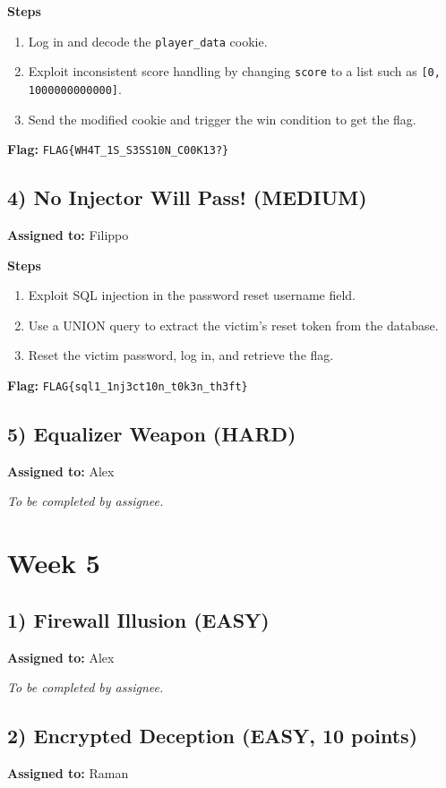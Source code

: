 \documentclass[10pt,a4paper]{article}
\begin{document}
\textbf{Steps}
\begin{enumerate}[leftmargin=*,noitemsep]
  \item Log in and decode the \texttt{player\_data} cookie.
  \item Exploit inconsistent score handling by changing \texttt{score} to a list such as \texttt{[0, 1000000000000]}.
  \item Send the modified cookie and trigger the win condition to get the flag.
\end{enumerate}

\textbf{Flag:} \texttt{FLAG\{WH4T\_1S\_S3SS10N\_C00K13?\}}

\subsection*{4) No Injector Will Pass! (MEDIUM)}
\textbf{Assigned to:} Filippo

\textbf{Steps}
\begin{enumerate}[leftmargin=*,noitemsep]
  \item Exploit SQL injection in the password reset username field.
  \item Use a UNION query to extract the victim's reset token from the database.
  \item Reset the victim password, log in, and retrieve the flag.
\end{enumerate}

\textbf{Flag:} \texttt{FLAG\{sql1\_1nj3ct10n\_t0k3n\_th3ft\}}


\subsection*{5) Equalizer Weapon (HARD)}
\textbf{Assigned to:} Alex

\textit{To be completed by assignee.}

\section{Week 5}

\subsection*{1) Firewall Illusion (EASY)}
\textbf{Assigned to:} Alex

\textit{To be completed by assignee.}

\subsection*{2) Encrypted Deception (EASY, 10 points)}
\textbf{Assigned to:} Raman
\end{document}

